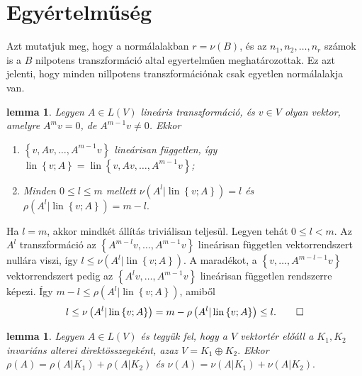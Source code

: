 \documentclass[9pt, a4paper, showtrims]{memoir}
\makeatletter
\renewenvironment{proof}[1][\proofname]
    {\par\pushQED{\qed}%
    \normalfont \topsep6\p@\@plus6\p@\relax
    \trivlist
    \item[\hskip\labelsep
        \itshape
    #1\@addpunct{:}]\ignorespaces}
    {\popQED\endtrivlist\@endpefalse}
\theoremstyle{plain}
\newtheorem{lemma}[proposition]{lemma}
\theoremstyle{remark}
\theoremstyle{definition}
\DeclareMathOperator{\lin}{lin}
\makeatother
\begin{document}
\section{Egyértelműség}
Azt mutatjuk meg, hogy a normálalakban $r=\nu\left( B \right)$,
és az $n_1,n_2,\dots,n_r$ számok is a $B$ nilpotens transzformáció altal egyertelműen meghatározottak.
Ez azt jelenti, hogy minden nillpotens transzformációnak csak egyetlen normálalakja van.
\begin{lemma}
    Legyen $A\in L\left( V \right)$ lineáris transzformáció, és $v\in V$ olyan vektor, amelyre
    $A^mv=0$, de $A^{m-1}v\neq 0$.
    Ekkor 
    \begin{enumerate}
        \item 
            $\left\{ v,Av,\dots,A^{m-1}v \right\}$ lineárisan független,
            így $\lin\left\{ v;A \right\}=\lin\left\{ v,Av,\dots,A^{m-1}v \right\}$;
        \item
            Minden $0\leq l\leq m$ mellett
            \begin{math}
                \nu\left( A^l|\lin\left\{ v;A \right\} \right)=l
            \end{math} 
            és
            \begin{math}
                \rho\left( A^l|\lin\left\{ v;A \right\} \right)=m-l.
            \end{math}\qedhere
    \end{enumerate}
\end{lemma}
\begin{proof}
    Ha $l=m$, akkor mindkét állítás triviálisan teljesül. Legyen tehát $0\leq l<m$.
    Az $A^l$ transzformáció az $\left\{ A^{m-l}v,\dots,A^{m-1}v \right\}$ 
    lineárisan független vektorrendszert nullára viszi,
    így $l\leq\nu\left( A^l|\lin\left\{ v;A \right\} \right)$.
    A maradékot, a 
    $\left\{ v,\dots,A^{m-l-1}v \right\}$ vektorrendszert pedig az 
    $\left\{ A^lv,\dots,A^{m-1}v \right\}$ lineárisan független rendszerre képezi.
    Így
    $m-l\leq \rho\left( A^l |\lin\left\{ v;A \right\}\right)$,
    amiből
    \[
        l\leq\nu\left( A^l|\lin\left\{ v;A \right\} \right)=m-\rho\left( A^l|\lin\left\{ v;A \right\} \right)\leq l.\qedhere
    \]
\end{proof}
\begin{lemma}
    Legyen $A\in L\left( V \right)$ és tegyük fel, hogy a $V$ vektortér előáll a $K_1,K_2$ invariáns alterei
    direktösszegeként, azaz 
    \(
    V=K_1\oplus K_2.
    \)
    Ekkor 
    \begin{math}
        \rho\left( A \right)=\rho\left( A|K_1 \right)+\rho\left( A|K_2 \right)
    \end{math}
    és
    \begin{math}
        \nu\left( A \right)=\nu\left( A|K_1 \right)+\nu\left( A|K_2 \right).
    \end{math}
    \qedhere
\end{lemma}
\end{document}
